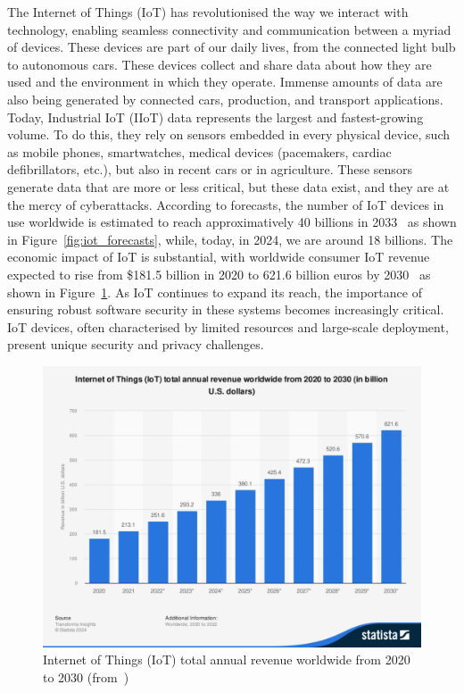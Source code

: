 The Internet of Things (IoT) has revolutionised the way we interact with technology, enabling seamless connectivity and communication between a myriad of devices. These devices are part of our daily lives, from the connected light bulb to autonomous cars. These devices collect and share data about how they are used and the environment in which they operate.  Immense amounts of data are also being generated by connected cars, production, and transport applications. Today, Industrial IoT (IIoT) data represents the largest and fastest-growing volume.
To do this, they rely on sensors embedded in every physical device, such as mobile phones, smartwatches, medical devices (pacemakers, cardiac defibrillators, etc.), but also in recent cars or in agriculture. These sensors generate data that are more or less critical, but these data exist, and they are at the mercy of cyberattacks.
According to forecasts, the number of IoT devices in use worldwide is estimated to reach approximatively 40 billions in 2033~\cite{statista_iot} as shown in Figure~\ref{fig:iot_forecasts}, while, today, in 2024, we are around 18 billions. The economic impact of IoT is substantial, with worldwide consumer IoT revenue expected to rise from \$181.5 billion in 2020 to 621.6 billion euros by 2030~\cite{statista_iot_revenu} as shown in Figure~\ref{fig:iot_revenue}.
As IoT continues to expand its reach, the importance of ensuring robust software security in these systems becomes increasingly critical. IoT devices, often characterised by limited resources and large-scale deployment, present unique security and privacy challenges.

\begin{figure}[ht]
    \centering
    \includegraphics[width=\linewidth, trim={1.25cm 4.75cm 1cm 3.75cm}, clip]{c1_intro/img/iot_revenue.pdf}
    \caption{Internet of Things (IoT) total annual revenue worldwide from 2020 to 2030 (from~\cite{statista_iot_revenu})}
    \label{fig:iot_revenue}
\end{figure}


